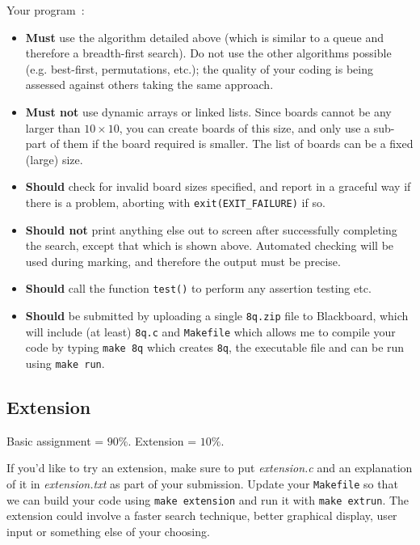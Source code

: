 \begin{exercise}
\noindent
Your program~:
\begin{itemize}
\item {\bf Must} use the algorithm detailed above (which is similar to a queue and therefore a breadth-first search). Do not use the other algorithms possible (e.g. best-first, permutations, etc.); the quality of your coding is being assessed against others taking the same approach.
\item {\bf Must not} use dynamic arrays or linked lists. Since boards cannot be any larger than $10 \times 10$, you can create boards of this size, and only use a sub-part of them if the board required is smaller. The list of boards can be a fixed (large) size.
\item {\bf Should} check for invalid board sizes specified, and report in a graceful way if there is a problem, aborting with \verb^exit(EXIT_FAILURE)^ if so.
\item {\bf Should not} print anything else out to screen after successfully
completing the search, except that which is shown above. Automated checking
will be used during marking, and therefore the output must be precise.
\item {\bf Should} call the function \verb^test()^ to perform any assertion testing etc.
\item {\bf Should} be submitted by uploading a single \verb^8q.zip^ file to Blackboard, which will include (at least) \verb^8q.c^ and \verb^Makefile^ which allows me to compile your code by typing \verb^make 8q^ which creates \verb^8q^, the executable file and can be run using \verb^make run^.
\end{itemize}

\subsection*{Extension}

Basic assignment = {\Large $90\%$}.
Extension = {\Large $10\%$}.

\noindent
If you'd like to try an extension, make sure to put {\it extension.c} and an explanation of it in {\it extension.txt}
as part of your submission. Update your \verb^Makefile^ so that we can build your code using \verb^make extension^ and run it with \verb^make extrun^.
\noindent The extension could
involve a faster search technique, better graphical display, user input
or something else of your choosing.

\end{exercise}
